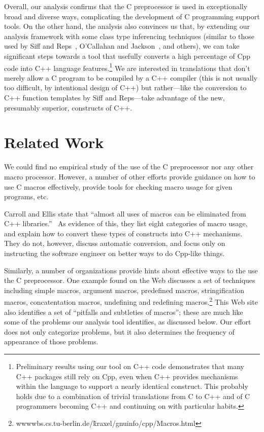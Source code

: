 Overall, our analysis confirms that the C preprocessor is used in
exceptionally broad and diverse ways, complicating the development of
C programming support tools.  On the other hand, the analysis also
convinces us that, by extending our analysis framework with some class
type inferencing techniques (similar to those used by Siff and
Reps~\cite{Siff-fse96}, O'Callahan and
Jackson~\cite{OCallahan-icse97}, and others), we can take significant
steps towards a tool that usefully converts a high percentage of Cpp
code into C++ language features.\footnote{Preliminary results using
our tool on C++ code demonstrates that many C++ packages still rely on
Cpp, even when C++ provides mechanisms within the language to support
a nearly identical construct.  This probably holds due to a
combination of trivial translations from C to C++ and of C programmers
becoming C++ and continuing on with particular habits.}  We are
interested in translations that don't merely allow a C program to be
compiled by a C++ compiler (this is not usually too difficult, by
intentional design of C++) but rather---like the conversion to C++
function templates by Siff and Reps---take advantage of the new,
presumably superior, constructs of C++.


\section{Related Work}\label{sec:related}

We could find no empirical study of the use of the C preprocessor nor
any other macro processor.  However, a number of other efforts provide
guidance on how to use C macros effectively, provide tools for
checking macro usage for given programs, etc.

Carroll and Ellis state that ``almost all uses of macros can be
eliminated from C++ libraries.''~\cite[p.146]{Carroll95} As evidence of this,
they list eight categories of macro usage, and explain how to convert
these types of constructs into C++ mechanisms.  They do not, however,
discuss automatic conversion, and focus only on instructing the
software engineer on better ways to do Cpp-like things.

Similarly, a number of organizations provide hints about effective
ways to the use the C preprocessor.  One example found on the Web
discusses a set of techniques including simple macros, argument
macros, predefined macros, stringification macros, concatentation
macros, undefining and redefining
macros.\footnote{wwwwbs.cs.tu-berlin.de/\~kraxel/gnuinfo/cpp/Macros.html}
This Web site also identifies a set of ``pitfalls and subtleties of
macros''; these are much like some of the problems our analysis tool
identifies, as discussed below.  Our effort does not only categorize
problems, but it also determines the frequency of appearance of those
problems. 

